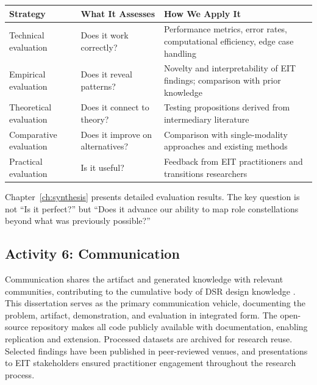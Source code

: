 \documentclass[../main.tex]{subfiles}
\begin{document}
\tableminimal
\small
\begin{center}
\begin{tabular}{@{}p{3cm}p{3.5cm}p{3.5cm}@{}}
\toprule
\textbf{Strategy} & \textbf{What It Assesses} & \textbf{How We Apply It} \\
\midrule
Technical evaluation & Does it work correctly? & Performance metrics, error rates, computational efficiency, edge case handling \\
Empirical evaluation & Does it reveal patterns? & Novelty and interpretability of EIT findings; comparison with prior knowledge \\
Theoretical evaluation & Does it connect to theory? & Testing propositions derived from intermediary literature \\
Comparative evaluation & Does it improve on alternatives? & Comparison with single-modality approaches and existing methods \\
Practical evaluation & Is it useful? & Feedback from EIT practitioners and transitions researchers \\
\bottomrule
\end{tabular}
\end{center}
\normalsize

Chapter~\ref{ch:synthesis} presents detailed evaluation results. The key question is not ``Is it perfect?'' but ``Does it advance our ability to map role constellations beyond what was previously possible?''

\subsection{Activity 6: Communication}

Communication shares the artifact and generated knowledge with relevant communities, contributing to the cumulative body of DSR design knowledge \cite{vombrocke2020accumulation}. This dissertation serves as the primary communication vehicle, documenting the problem, artifact, demonstration, and evaluation in integrated form. The open-source repository makes all code publicly available with documentation, enabling replication and extension. Processed datasets are archived for research reuse. Selected findings have been published in peer-reviewed venues, and presentations to EIT stakeholders ensured practitioner engagement throughout the research process.
\end{document}
